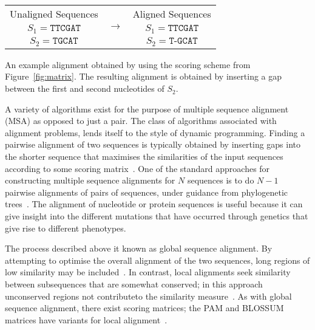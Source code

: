    
\begin{minipage}{\linewidth}
\centering
{} \label{tab:alignment}
\begin{tabular}{clc}
\multicolumn{1}{|l|}{Unaligned Sequences} & \multicolumn{1}{l|}{\multirow{3}{*}{$\rightarrow$}} & \multicolumn{1}{l|}{Aligned Sequences} \\ \cline{1-1} \cline{3-3} 
$S_1=\texttt{TTCGAT}$                     & \multicolumn{1}{l}{}                               & $S_1=\texttt{TTCGAT}$                  \\
$S_2=\texttt{TGCAT}$                      & \multicolumn{1}{l}{}                               & $S_2=\texttt{T-GCAT}$                 
\end{tabular}\par
{An example alignment obtained by using the scoring scheme from Figure~\ref{fig:matrix}. The resulting alignment is obtained by inserting a gap between the first and second nucleotides of $S_2$. }
\end{minipage}

A variety of algorithms exist for the purpose of multiple sequence alignment (MSA) as opposed to just a pair. The class of algorithms associated with alignment problems, lends itself to the style of dynamic programming. Finding a pairwise alignment of two sequences is typically obtained by inserting gaps into the shorter sequence that maximises the similarities of the input sequences according to some scoring matrix~\cite{edgar2006multiple}. One of the standard approaches for constructing multiple sequence alignments for $N$ sequences is to do $N-1$ pairwise alignments of pairs of sequences, under guidance from phylogenetic trees~\cite{feng1987progressive}.
	The alignment of nucleotide or protein sequences is useful because it can give insight into the different mutations that have occurred through genetics that give rise to different phenotypes. 


The process described above it known as global sequence alignment. By attempting to optimise the overall alignment of the two sequences, long regions of low similarity may be included~\cite{needleman1970general}. In contrast, local alignments seek similarity between subsequences that are somewhat conserved; in this approach unconserved regions not  contributeto the similarity measure~\cite{goad1982pattern, sellers1984pattern, smith1981comparison}. As with global sequence alignment, there exist scoring matrices; the PAM and BLOSSUM matrices have variants for local alignment~\cite{mount2008comparison}. 
